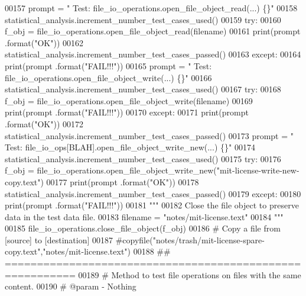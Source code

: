 \begin{DoxyCode}
00157         prompt = \textcolor{stringliteral}{"  Test: file\_io\_operations.open\_file\_object\_read(...) \{\}"}
00158         statistical\_analysis.increment\_number\_test\_cases\_used()
00159         \textcolor{keywordflow}{try}:
00160             f\_obj = file\_io\_operations.open\_file\_object\_read(filename)
00161             print(prompt .format(\textcolor{stringliteral}{"OK"}))
00162             statistical\_analysis.increment\_number\_test\_cases\_passed()
00163         \textcolor{keywordflow}{except}:
00164             print(prompt .format(\textcolor{stringliteral}{"FAIL!!!"}))
00165         prompt = \textcolor{stringliteral}{"  Test: file\_io\_operations.open\_file\_object\_write(...)    \{\}"}
00166         statistical\_analysis.increment\_number\_test\_cases\_used()
00167         \textcolor{keywordflow}{try}:
00168             f\_obj = file\_io\_operations.open\_file\_object\_write(filename)
00169             print(prompt .format(\textcolor{stringliteral}{"FAIL!!!"}))
00170         \textcolor{keywordflow}{except}:
00171             print(prompt .format(\textcolor{stringliteral}{"OK"}))
00172             statistical\_analysis.increment\_number\_test\_cases\_passed()
00173         prompt = \textcolor{stringliteral}{"  Test: file\_io\_ops[BLAH].open\_file\_object\_write\_new(...) \{\}"}
00174         statistical\_analysis.increment\_number\_test\_cases\_used()
00175         \textcolor{keywordflow}{try}:
00176             f\_obj = file\_io\_operations.open\_file\_object\_write\_new(\textcolor{stringliteral}{"mit-license-write-new-copy.text"})
00177             print(prompt .format(\textcolor{stringliteral}{"OK"}))
00178             statistical\_analysis.increment\_number\_test\_cases\_passed()
00179         \textcolor{keywordflow}{except}:
00180             print(prompt .format(\textcolor{stringliteral}{"FAIL!!!"}))
00181         \textcolor{stringliteral}{"""}
00182 \textcolor{stringliteral}{            Close the file object to preserve data in the test data file.}
00183 \textcolor{stringliteral}{            filename = "notes/mit-license.text"}
00184 \textcolor{stringliteral}{        """}
00185         file\_io\_operations.close\_file\_object(f\_obj)
00186         \textcolor{comment}{# Copy a file from [source] to [destination]}
00187         \textcolor{comment}{#copyfile("notes/trash/mit-license-spare-copy.text","notes/mit-license.text")}
00188     \textcolor{comment}{## =========================================================}
00189     \textcolor{comment}{#   Method to test file operations on files with the same content.}
00190     \textcolor{comment}{#   @param - Nothing}

\end{DoxyCode}
